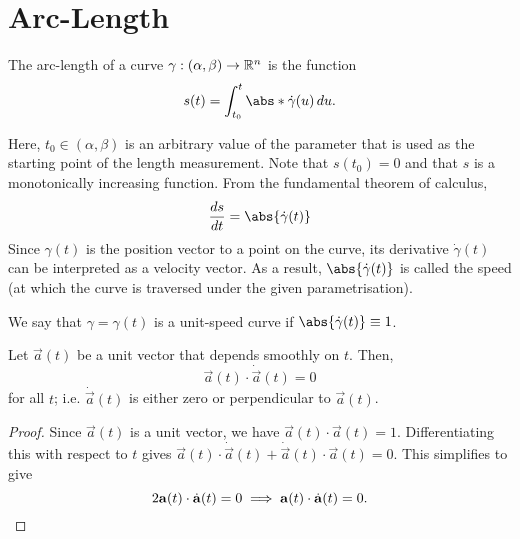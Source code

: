 \documentclass[11pt]{penrose}
\newcommand{\keyword}[1]{\textsf{#1}}
\begin{document}
\section{Arc-Length}
\begin{ndfn}
    The \keyword{arc-length} of a curve $\gamma : (\alpha, \beta) \to \R^n$ is the function
    \begin{equation}
        s(t) = \int_{t_0}^{t} \abs*{\dot{\gamma}(u)} \,du.
        \label{eq:arclength-dfn}
    \end{equation}
\end{ndfn}

Here, $t_0 \in (\alpha, \beta)$ is an arbitrary value of the parameter that is used as the starting point of the length measurement. Note that $s(t_0) = 0$ and that $s$ is a monotonically increasing function. From the fundamental theorem of calculus,
\begin{equation}
    \frac{ds}{dt} = \abs{\dot{\gamma}(t)}
    \label{eq:speed-dfn}
\end{equation}
Since $\gamma(t)$ is the \keyword{position} vector to a point on the curve, its derivative $\dot{\gamma}(t)$ can be interpreted as a \keyword{velocity} vector. As a result, $\abs{\dot{\gamma}(t)}$ is called the \keyword{speed} (at which the curve is traversed under the given parametrisation).

\begin{ndfn}
    We say that $\gamma = \gamma(t)$ is a \keyword{unit-speed curve} if $\abs{\dot{\gamma}(t)} \equiv 1$.
\end{ndfn}

\begin{nprop}\label{prop:unit-vector-perp}
    Let $\vec{a}(t)$ be a unit vector that depends smoothly on $t$. Then,
    \begin{equation}
        \vec{a}(t) \cdot \dot{\vec{a}}(t) = 0
    \end{equation}
    for all $t$; i.e. $\dot{\vec{a}}(t)$ is either zero or perpendicular to $\vec{a}(t)$.
\end{nprop}
\begin{proof}
    Since $\vec{a}(t)$ is a unit vector, we have $\vec{a}(t) \cdot \vec{a}(t) = 1$. Differentiating this with respect to $t$ gives $\vec{a}(t) \cdot \dot{\vec{a}}(t) + \dot{\vec{a}}(t) \cdot \vec{a}(t) = 0$. This simplifies to give
    \begin{equation}
        2 \vec{a}(t) \cdot \dot{\vec{a}}(t) = 0
        \implies
        \vec{a}(t) \cdot \dot{\vec{a}}(t) = 0.\qedhere
    \end{equation}
\end{proof}
\end{document}
